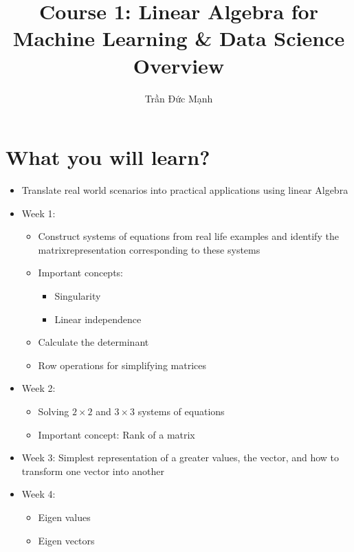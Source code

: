 \documentclass[12pt,a4paper]{article}
\author{Trần Đức Mạnh}
\title{Course 1: Linear Algebra for Machine Learning \& Data Science\\Overview}
\begin{document}
\maketitle

\section*{What you will learn?}
\begin{itemize}
    \item Translate real world scenarios into practical applications using linear Algebra
    \item Week 1:
          \begin{itemize}
              \item Construct systems of equations from real life examples and identify the matrix\break representation corresponding to these systems
              \item Important concepts:
                    \begin{itemize}
                        \item Singularity
                        \item Linear independence
                    \end{itemize}
              \item Calculate the determinant
              \item Row operations for simplifying matrices
          \end{itemize}
    \item Week 2: 
    \begin{itemize}
        \item Solving $2\times2$ and $3\times3$ systems of equations
        \item Important concept: Rank of a matrix
    \end{itemize}
    \item Week 3: Simplest representation of a greater values, the vector, and how to transform one vector into another
    \item Week 4: 
    \begin{itemize}
        \item Eigen values 
        \item Eigen vectors
    \end{itemize}
\end{itemize}
\end{document}

